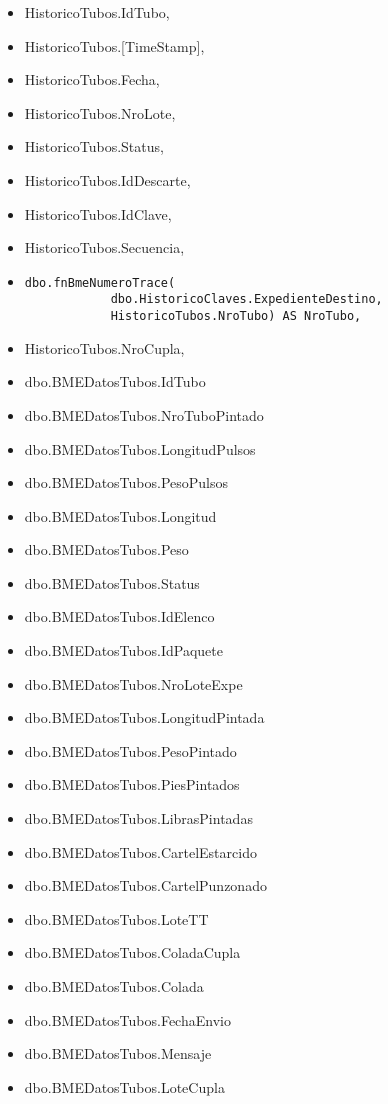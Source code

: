 \documentclass[]{article}
\begin{document}
\begin{itemize}[label=\textcolor{blue}{\textbullet}]
	\item HistoricoTubos.IdTubo,
	\item HistoricoTubos.[TimeStamp],
	\item HistoricoTubos.Fecha,
	\item HistoricoTubos.NroLote,
	\item HistoricoTubos.Status,
	\item HistoricoTubos.IdDescarte,
	\item HistoricoTubos.IdClave,
	\item HistoricoTubos.Secuencia,
	\item \begin{verbatim}dbo.fnBmeNumeroTrace(
			dbo.HistoricoClaves.ExpedienteDestino, 
			HistoricoTubos.NroTubo) AS NroTubo,\end{verbatim}
	\item HistoricoTubos.NroCupla,
	\item dbo.BMEDatosTubos.IdTubo
	\item dbo.BMEDatosTubos.NroTuboPintado
	\item dbo.BMEDatosTubos.LongitudPulsos
	\item dbo.BMEDatosTubos.PesoPulsos
	\item dbo.BMEDatosTubos.Longitud
	\item dbo.BMEDatosTubos.Peso
	\item dbo.BMEDatosTubos.Status
	\item dbo.BMEDatosTubos.IdElenco
	\item dbo.BMEDatosTubos.IdPaquete
	\item dbo.BMEDatosTubos.NroLoteExpe
	\item dbo.BMEDatosTubos.LongitudPintada
	\item dbo.BMEDatosTubos.PesoPintado
	\item dbo.BMEDatosTubos.PiesPintados
	\item dbo.BMEDatosTubos.LibrasPintadas
	\item dbo.BMEDatosTubos.CartelEstarcido
	\item dbo.BMEDatosTubos.CartelPunzonado
	\item dbo.BMEDatosTubos.LoteTT
	\item dbo.BMEDatosTubos.ColadaCupla
	\item dbo.BMEDatosTubos.Colada
	\item dbo.BMEDatosTubos.FechaEnvio
	\item dbo.BMEDatosTubos.Mensaje
	\item dbo.BMEDatosTubos.LoteCupla

\end{itemize}
\end{document}
